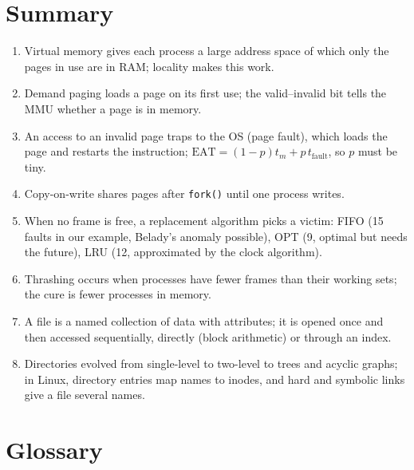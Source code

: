 \documentclass[11pt,a4paper]{article}
\newcommand{\cmd}[1]{\texttt{#1}}
\begin{document}
\section{Summary}

\begin{keyidea}
\begin{enumerate}[leftmargin=1.4em]
  \item Virtual memory gives each process a large address space of which only the pages in use are in RAM; locality makes this work.
  \item Demand paging loads a page on its first use; the valid--invalid bit tells the MMU whether a page is in memory.
  \item An access to an invalid page traps to the OS (page fault), which loads the page and restarts the instruction; $\text{EAT} = (1-p)t_m + p\,t_{\text{fault}}$, so $p$ must be tiny.
  \item Copy-on-write shares pages after \cmd{fork()} until one process writes.
  \item When no frame is free, a replacement algorithm picks a victim: FIFO (15 faults in our example, Belady's anomaly possible), OPT (9, optimal but needs the future), LRU (12, approximated by the clock algorithm).
  \item Thrashing occurs when processes have fewer frames than their working sets; the cure is fewer processes in memory.
  \item A file is a named collection of data with attributes; it is opened once and then accessed sequentially, directly (block arithmetic) or through an index.
  \item Directories evolved from single-level to two-level to trees and acyclic graphs; in Linux, directory entries map names to inodes, and hard and symbolic links give a file several names.
\end{enumerate}
\end{keyidea}

\section{Glossary}
\end{document}
